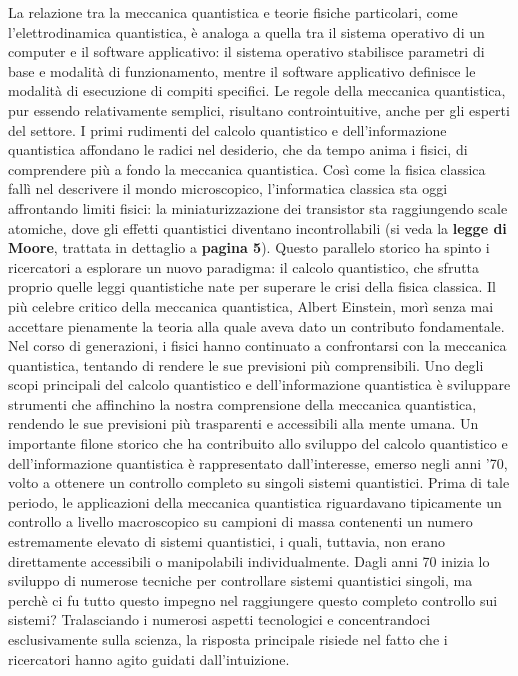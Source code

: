 \documentclass[a4paper,12pt]{report}
\theoremstyle{plain}
\begin{document}
La relazione tra la meccanica quantistica e teorie fisiche particolari, come l'elettrodinamica quantistica, è analoga a quella tra il sistema operativo di un computer e il software applicativo: il sistema operativo stabilisce parametri di base e modalità di funzionamento, mentre il software applicativo definisce le modalità di esecuzione di compiti specifici.
Le regole della meccanica quantistica, pur essendo relativamente semplici, risultano controintuitive, anche per gli esperti del settore. I primi rudimenti del calcolo quantistico e dell'informazione quantistica affondano le radici nel desiderio, che da tempo anima i fisici, di comprendere più a fondo la meccanica quantistica. Così come la fisica classica fallì nel descrivere il mondo microscopico, l'informatica classica sta oggi affrontando limiti fisici: la miniaturizzazione dei transistor sta raggiungendo scale atomiche, dove gli effetti quantistici diventano incontrollabili (si veda la \textbf{legge di Moore}, trattata in dettaglio a \textbf{pagina 5}). Questo parallelo storico ha spinto i ricercatori a esplorare un nuovo paradigma: il calcolo quantistico, che sfrutta proprio quelle leggi quantistiche nate per superare le crisi della fisica classica. Il più celebre critico della meccanica quantistica, Albert Einstein, morì senza mai accettare pienamente la teoria alla quale aveva dato un contributo fondamentale. Nel corso di generazioni, i fisici hanno continuato a confrontarsi con la meccanica quantistica, tentando di rendere le sue previsioni più comprensibili.
Uno degli scopi principali del calcolo quantistico e dell'informazione quantistica è sviluppare strumenti che affinchino la nostra comprensione della meccanica quantistica, rendendo le sue previsioni più trasparenti e accessibili alla mente umana. Un importante filone storico che ha contribuito allo sviluppo del calcolo quantistico e dell'informazione quantistica è rappresentato dall'interesse, emerso negli anni '70, volto a ottenere un controllo completo su singoli sistemi quantistici. Prima di tale periodo, le applicazioni della meccanica quantistica riguardavano tipicamente un controllo a livello macroscopico su campioni di massa contenenti un numero estremamente elevato di sistemi quantistici, i quali, tuttavia, non erano direttamente accessibili o manipolabili individualmente. Dagli anni 70 inizia lo sviluppo di numerose tecniche per controllare sistemi quantistici singoli, ma perchè ci fu tutto questo impegno nel raggiungere questo completo controllo sui sistemi? Tralasciando i numerosi aspetti tecnologici e concentrandoci esclusivamente sulla scienza, la risposta principale risiede nel fatto che i ricercatori hanno agito guidati dall'intuizione. 
\end{document}
